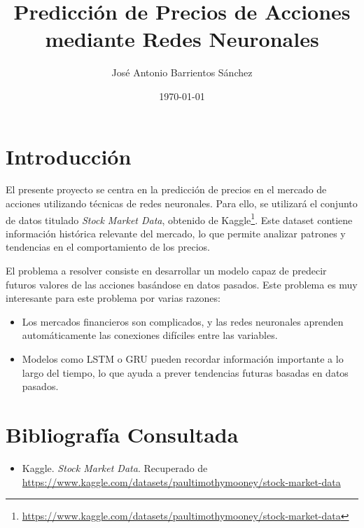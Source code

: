 \documentclass[12pt]{article}
\title{Predicción de Precios de Acciones mediante Redes Neuronales}
\author{José Antonio Barrientos Sánchez}
\date{\today}
\begin{document}
\maketitle

\section*{Introducción}
El presente proyecto se centra en la predicción de precios en el mercado de acciones utilizando técnicas de redes neuronales. Para ello, se utilizará el conjunto de datos titulado \emph{Stock Market Data}, obtenido de Kaggle\footnote{\url{https://www.kaggle.com/datasets/paultimothymooney/stock-market-data}}. Este dataset contiene información histórica relevante del mercado, lo que permite analizar patrones y tendencias en el comportamiento de los precios.

El problema a resolver consiste en desarrollar un modelo capaz de predecir futuros valores de las acciones basándose en datos pasados. Este problema es muy interesante para este problema por varias razones:

\begin{itemize}
    \item Los mercados financieros son complicados, y las redes neuronales aprenden automáticamente las conexiones difíciles entre las variables.
    \item  Modelos como LSTM o GRU pueden recordar información importante a lo largo del tiempo, lo que ayuda a prever tendencias futuras basadas en datos pasados.
\end{itemize}



\section*{Bibliografía Consultada}
\begin{itemize}
    \item Kaggle. \textit{Stock Market Data}. Recuperado de \url{https://www.kaggle.com/datasets/paultimothymooney/stock-market-data}
\end{itemize}
\end{document}
